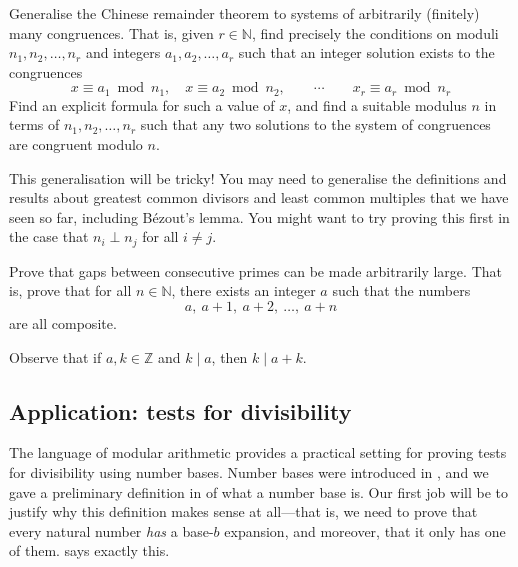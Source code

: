 \begin{oexercise}
\label{exGeneralisedCRT}
Generalise the Chinese remainder theorem to systems of arbitrarily (finitely) many congruences. That is, given $r \in \mathbb{N}$, find precisely the conditions on moduli $n_1,n_2,\dots,n_r$ and integers $a_1,a_2,\dots,a_r$ such that an integer solution exists to the congruences
\[ x \equiv a_1 \bmod{n_1}, \quad x \equiv a_2 \bmod{n_2}, \qquad \cdots \qquad x_r \equiv a_r \bmod{n_r} \]
Find an explicit formula for such a value of $x$, and find a suitable modulus $n$ in terms of $n_1,n_2,\dots,n_r$ such that any two solutions to the system of congruences are congruent modulo $n$.
\begin{backhint}
This generalisation will be tricky! You may need to generalise the definitions and results about greatest common divisors and least common multiples that we have seen so far, including B\'{e}zout's lemma. You might want to try proving this first in the case that $n_i \perp n_j$ for all $i \ne j$.
\end{backhint}
\end{oexercise}

\begin{exercise}
\label{exGapsBetweenPrimesLarge}
Prove that gaps between consecutive primes can be made arbitrarily large. That is, prove that for all $n \in \mathbb{N}$, there exists an integer $a$ such that the numbers
\[ a,\ a+1,\ a+2,\ \dots,\ a+n \]
are all composite.
\begin{backhint}
Observe that if $a,k \in \mathbb{Z}$ and $k \mid a$, then $k \mid a+k$.
\end{backhint}
\end{exercise}

\subsection*{Application: tests for divisibility}

The language of modular arithmetic provides a practical setting for proving tests for divisibility using number bases. Number bases were introduced in , and we gave a preliminary definition in  of what a number base is. Our first job will be to justify why this definition makes sense at all---that is, we need to prove that every natural number \textit{has} a base-$b$ expansion, and moreover, that it only has one of them.  says exactly this.

